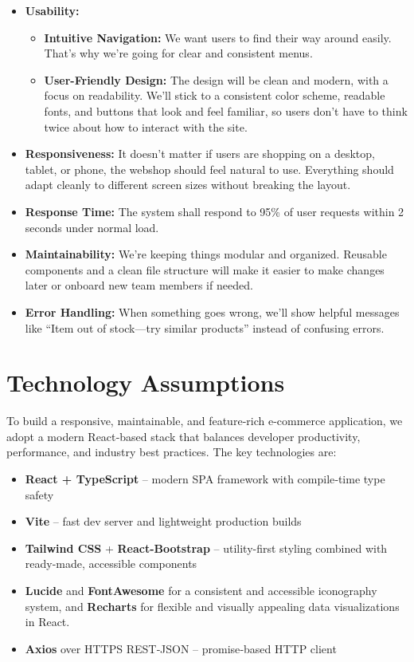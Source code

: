 \documentclass[12pt]{article}
\begin{document}
\begin{itemize}
 \item \textbf{Usability:}
\begin{itemize}
    \item \textbf{Intuitive Navigation:}
	We want users to find their way around easily.
	That’s why we’re going for clear and consistent menus.

    \item \textbf{User-Friendly Design:}
    The design will be clean and modern, with a focus on readability.
	We’ll stick to a consistent color scheme, readable fonts, and buttons that look and feel familiar, so users don’t have to think twice about how to interact with the site.
 \end{itemize}

\item \textbf{Responsiveness:}
    It doesn't matter if users are shopping on a desktop, tablet, or phone, the webshop should feel natural to use.
	Everything should adapt cleanly to different screen sizes without breaking the layout.

    \item \textbf{Response Time:}
    The system shall respond to 95\% of user requests within 2 seconds under normal load.

    \item \textbf{Maintainability:}
    We’re keeping things modular and organized.
	Reusable components and a clean file structure will make it easier to make changes later or onboard new team members if needed.

    \item \textbf{Error Handling:}
        When something goes wrong, we'll show helpful messages like “Item out of stock—try similar products” instead of confusing errors.
\end{itemize}

\section{Technology Assumptions}\label{sec:technology-assumptions}

To build a responsive, maintainable, and feature‑rich e-commerce
application, we adopt a modern React‑based stack that balances developer
productivity, performance, and industry best practices.
The key technologies are:

\begin{itemize}
	\item \textbf{React + TypeScript} – modern SPA framework with compile‑time type safety
	\item \textbf{Vite} – fast dev server and lightweight production builds
	\item \textbf{Tailwind CSS} + \textbf{React-Bootstrap} – utility-first styling combined with ready-made, accessible components
	\item \textbf{Lucide} and \textbf{FontAwesome} for a consistent and accessible iconography system, and \textbf{Recharts} for flexible and visually appealing data visualizations in React.
	\item \textbf{Axios} over HTTPS REST‑JSON – promise‑based HTTP client
\end{itemize}
\end{document}
